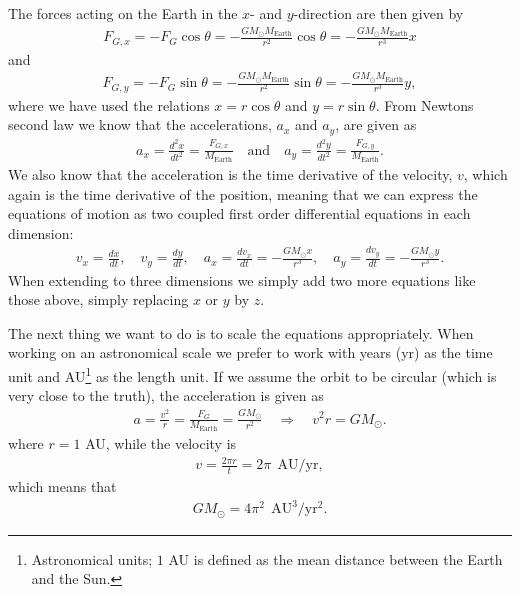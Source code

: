 \documentclass[12pt, a4paper]{article}
\begin{document}
The forces acting on the Earth in the $x$- and $y$-direction are then given by 
\begin{align*}
F_{G,x} = - F_G \cos\theta  = - \frac{GM_{\odot} M_{\text{Earth}}}{r^2}\cos\theta 
							= - \frac{GM_{\odot} M_{\text{Earth}}}{r^3}x 
\end{align*} 
and 
\begin{align*}
F_{G,y} = - F_G \sin\theta  = - \frac{GM_{\odot} M_{\text{Earth}}}{r^2}\sin\theta 
							= - \frac{GM_{\odot} M_{\text{Earth}}}{r^3}y,  
\end{align*}
where we have used the relations $x = r\cos\theta$ and $y = r\sin\theta$. From Newtons second law we know 
that the accelerations, $a_x$ and $a_y$, are given as 
\begin{align*}
a_x = \frac{d^2x}{dt^2} = \frac{F_{G,x}}{M_{\text{Earth}}} \quad \text{and} \quad 
a_y = \frac{d^2y}{dt^2} = \frac{F_{G,y}}{M_{\text{Earth}}}. 
\end{align*} 
We also know that the acceleration is the time derivative of the velocity, $v$, which again is 
the time derivative of the position, meaning that we can express the equations of motion as two 
coupled first order differential equations in each dimension:  
\begin{align*}
v_x = \frac{dx}{dt}, \quad v_y = \frac{dy}{dt}, \quad 
a_x = \frac{dv_x}{dt} = -\frac{GM_{\odot}x}{r^3}, \quad a_y = \frac{dv_y}{dt} = -\frac{GM_{\odot}y}{r^3}.   
\end{align*}
When extending to three dimensions we simply add two more equations like those above, simply 
replacing $x$ or $y$ by $z$. 

The next thing we want to do is to scale the equations appropriately. When working on an astronomical 
scale we prefer to work with years (yr) as the time unit and AU\footnote{Astronomical units; $1$ AU is
defined as the mean distance between the Earth and the Sun.} as the length unit. If we assume the orbit 
to be circular (which is very close to the truth), the acceleration is given as 
\begin{align*}
a = \frac{v^2}{r} = \frac{F_G}{M_{\text{Earth}}} = \frac{GM_{\odot}}{r^2} \quad \Rightarrow \quad 
v^2 r = GM_{\odot}. 
\end{align*}  
where $r = 1$ AU, while the velocity is 
\begin{align*}
v = \frac{2\pi r}{t} = 2\pi \:\: \text{AU/yr},   
\end{align*}
which means that 
\begin{align*}
GM_{\odot} = 4\pi^2 \:\: \text{AU}^3/\text{yr}^2. 
\end{align*}
\end{document}
